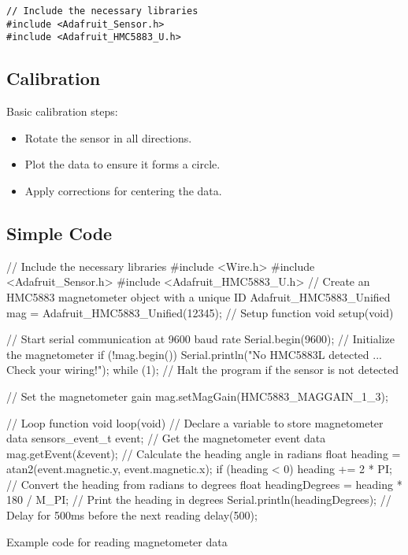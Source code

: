 \begin{verbatim}
// Include the necessary libraries
#include <Adafruit_Sensor.h>
#include <Adafruit_HMC5883_U.h>
\end{verbatim}

\subsection{Calibration}
Basic calibration steps:
\begin{itemize}
	\item Rotate the sensor in all directions.
	\item Plot the data to ensure it forms a circle.
	\item Apply corrections for centering the data.
\end{itemize}
\subsection{Simple Code}
\begin{code}[h!]
	\begin{Arduino}
	// Include the necessary libraries
	#include <Wire.h>
	#include <Adafruit_Sensor.h>
	#include <Adafruit_HMC5883_U.h>
	// Create an HMC5883 magnetometer object with a unique ID
	Adafruit_HMC5883_Unified mag = Adafruit_HMC5883_Unified(12345);
	// Setup function
	void setup(void) {
		// Start serial communication at 9600 baud rate
		Serial.begin(9600);
		// Initialize the magnetometer
		if (!mag.begin()) {
			Serial.println("No HMC5883L detected ... Check your wiring!");
			while (1);  // Halt the program if the sensor is not detected
		}
		
		// Set the magnetometer gain
		mag.setMagGain(HMC5883_MAGGAIN_1_3);
	}
	// Loop function
	void loop(void) {
		// Declare a variable to store magnetometer data
		sensors_event_t event;
		// Get the magnetometer event data
		mag.getEvent(&event);
		// Calculate the heading angle in radians
		float heading = atan2(event.magnetic.y, event.magnetic.x);
		if (heading < 0) heading += 2 * PI;
		// Convert the heading from radians to degrees
		float headingDegrees = heading * 180 / M_PI;
		// Print the heading in degrees
		Serial.println(headingDegrees);
		// Delay for 500ms before the next reading
		delay(500);
	}
	
	\end{Arduino}
	\caption{Example code for reading magnetometer data}\label{code:magnetometer-example}
\end{code}

